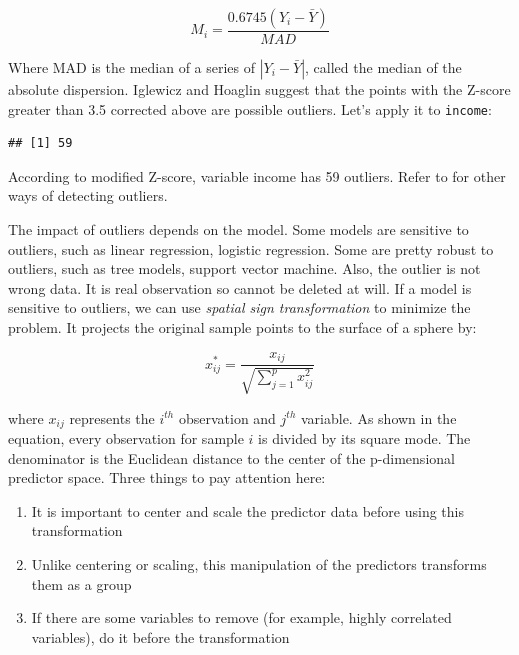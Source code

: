 \documentclass[12pt,]{krantz}
\newenvironment{Shaded}{\begin{snugshade}}{\end{snugshade}}
\newcommand{\KeywordTok}[1]{\textcolor[rgb]{0.13,0.29,0.53}{\textbf{{#1}}}}
\newcommand{\FloatTok}[1]{\textcolor[rgb]{0.00,0.00,0.81}{{#1}}}
\newcommand{\CommentTok}[1]{\textcolor[rgb]{0.56,0.35,0.01}{\textit{{#1}}}}
\newcommand{\NormalTok}[1]{{#1}}
\providecommand{\tightlist}{%
  \setlength{\itemsep}{0pt}\setlength{\parskip}{0pt}}
\theoremstyle{definition}
\theoremstyle{definition}
\theoremstyle{remark}
\begin{document}
\[M_{i}=\frac{0.6745(Y_{i}-\bar{Y})}{MAD}\]

Where MAD is the median of a series of \(|Y_ {i} - \bar{Y}|\), called
the median of the absolute dispersion. Iglewicz and Hoaglin suggest that
the points with the Z-score greater than 3.5 corrected above are
possible outliers. Let's apply it to \texttt{income}:

\begin{Shaded}
\end{Shaded}

\begin{verbatim}
## [1] 59
\end{verbatim}

According to modified Z-score, variable income has 59 outliers. Refer to
\citep{mad1} for other ways of detecting outliers.

The impact of outliers depends on the model. Some models are sensitive
to outliers, such as linear regression, logistic regression. Some are
pretty robust to outliers, such as tree models, support vector machine.
Also, the outlier is not wrong data. It is real observation so cannot be
deleted at will. If a model is sensitive to outliers, we can use
\emph{spatial sign transformation} \citep{ssp} to minimize the problem.
It projects the original sample points to the surface of a sphere by:

\[x_{ij}^{*}=\frac{x_{ij}}{\sqrt{\sum_{j=1}^{p}x_{ij}^{2}}}\]

where \(x_{ij}\) represents the \(i^{th}\) observation and \(j^{th}\)
variable. As shown in the equation, every observation for sample \(i\)
is divided by its square mode. The denominator is the Euclidean distance
to the center of the p-dimensional predictor space. Three things to pay
attention here:

\begin{enumerate}
\def\labelenumi{\arabic{enumi}.}
\tightlist
\item
  It is important to center and scale the predictor data before using
  this transformation
\item
  Unlike centering or scaling, this manipulation of the predictors
  transforms them as a group
\item
  If there are some variables to remove (for example, highly correlated
  variables), do it before the transformation
\end{enumerate}
\end{document}
